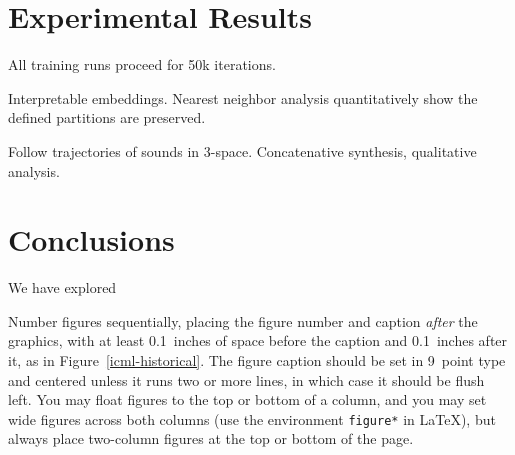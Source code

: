 \documentclass{article}
\begin{document}
\section{Experimental Results}

All training runs proceed for 50k iterations.



Interpretable embeddings.
Nearest neighbor analysis quantitatively show the defined partitions are preserved.

Follow trajectories of sounds in 3-space.
Concatenative synthesis, qualitative analysis.



\section{Conclusions}

We have explored


Number figures sequentially, placing the figure number and caption
{\it after\/} the graphics, with at least 0.1~inches of space before
the caption and 0.1~inches after it, as in
Figure~\ref{icml-historical}.  The figure caption should be set in
9~point type and centered unless it runs two or more lines, in which
case it should be flush left.  You may float figures to the top or
bottom of a column, and you may set wide figures across both columns
(use the environment {\tt figure*} in \LaTeX), but always place
two-column figures at the top or bottom of the page.



\end{document}
